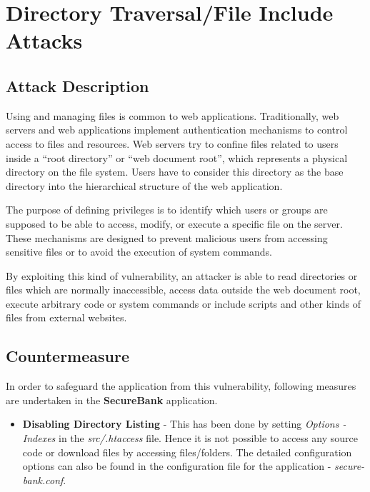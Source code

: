 \section{Directory Traversal/File Include Attacks}

\subsection{Attack Description}
Using and managing files is common to web applications. Traditionally, web servers and web applications implement authentication mechanisms to control access to files and resources. Web servers try to confine files related to users inside a \enquote{root directory} or \enquote{web document root}, which represents a physical directory on the file system. Users have to consider this directory as the base directory into the hierarchical structure of the web application.

The purpose of defining privileges is to identify which users or groups are supposed to be able to access, modify, or execute a specific file on the server. These mechanisms are designed to prevent malicious users from accessing sensitive files or to avoid the execution of system commands.

By exploiting this kind of vulnerability, an attacker is able to read directories or files which are normally inaccessible, access data outside the web document root, execute arbitrary code or system commands or include scripts and other kinds of files from external websites.

\subsection{Countermeasure}
In order to safeguard the application from this vulnerability, following measures are undertaken in the \textbf{SecureBank} application.
\begin{itemize}
\item \textbf{Disabling Directory Listing} - This has been done by setting \textit{Options -Indexes} in the \textit{src/.htaccess} file. Hence it is not possible to access any source code or download files by accessing files/folders. The detailed configuration options can also be found in the configuration file for the application - \textit{secure-bank.conf}.
\end{itemize}

\clearpage